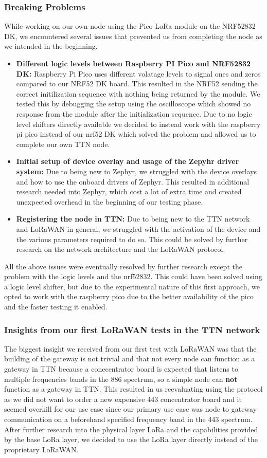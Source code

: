 \subsubsection{Breaking Problems}
While working on our own node using the Pico LoRa module on the NRF52832 DK, we encountered several issues that prevented us from completing the node as we intended in the beginning. 
\begin{itemize}
    \item \textbf{Different logic levels between Raspberry PI Pico and NRF52832 DK:} Raspberry Pi Pico uses different volatage levels to signal ones and zeros compared to our NRF52 DK board. This resulted in the NRF52 sending the correct initilization sequence with nothing being returned by the module. We tested this by debugging the setup using the oscilloscope which showed no response from the module after the initialization sequence. Due to no logic level shifters directly available we decided to instead work with the raspberry pi pico instead of our nrf52 DK which solved the problem and allowed us to complete our own TTN node.
    \item \textbf{Initial setup of device overlay and usage of the Zepyhr driver system:} Due to being new to Zephyr, we struggled with the device overlays and how to use the onboard drivers of Zephyr. This resulted in additional research needed into Zephyr, which cost a lot of extra time and created unexpected overhead in the beginning of our testing phase.
    \item \textbf{Registering the node in TTN:} Due to being new to the TTN network and LoRaWAN in general, we struggled with the activation of the device and the various parameters required to do so. This could be solved by further research on the network architecture and the LoRaWAN protocol.
\end{itemize}
All the above issues were eventually resolved by further research except the problem with the logic levels and the nrf52832. This could have been solved using a logic level shifter, but due to the experimental nature of this first approach, we opted to work with the raspberry pico due to the better availability of the pico and the faster testing it enabled.

\subsubsection{Insights from our first LoRaWAN tests in the TTN network}
The biggest insight we received from our first test with LoRaWAN was that the building of the gateway is not trivial and that not every node can function as a gateway in TTN because a conecentrator board is expected that listens to multiple frequencies bands in the 886 spectrum, so a simple node can \textbf{not} function as a gateway in TTN. This resulted in us reevaluating using the protocol as we did not want to order a new expensive 443 concentrator board and it seemed overkill for our use case since our primary use case was node to gateway communication on a beforehand specified frequency band in the 443 spectrum. 
After further research into the physical layer LoRa and the capabilities provided by the base LoRa layer, we decided to use the LoRa layer directly instead of the proprietary LoRaWAN.

